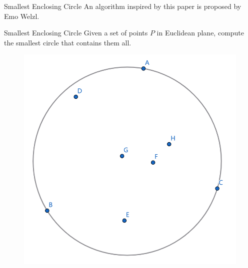 \documentclass{beamer}
\newcommand{\lf}{\left[}
\newcommand{\rf}{\right]}
\begin{document}
\begin{frame}{Smallest Enclosing Circle}
    An algorithm inspired by this paper is proposed by Emo Welzl\cite{emo}.

	\begin{block}{Smallest Enclosing Circle}
		Given a set of points $P$ in Euclidean plane, compute the smallest circle that contains them all.
	\end{block}

	\begin{figure}[r]
		\includegraphics[width=0.3\linewidth]{pics/smallest_enclosing_circle_illustration.png}
	\end{figure}







\end{frame}
\end{document}
